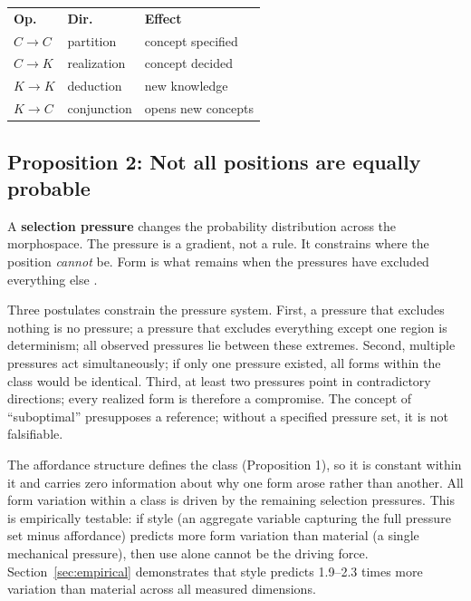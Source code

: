 \begin{center}\small
\begin{tabular}{@{}l@{\;\;}l@{\;\;}l@{}}
\textbf{Op.} & \textbf{Dir.} & \textbf{Effect} \\[2pt]
$C \!\to\! C$ & partition & concept specified \\
$C \!\to\! K$ & realization & concept decided \\
$K \!\to\! K$ & deduction & new knowledge \\
$K \!\to\! C$ & conjunction & opens new concepts \\
\end{tabular}
\end{center}

\subsection{Proposition 2: Not all positions are equally probable}
\label{sec:prop2}

A \textbf{selection pressure} changes the probability distribution across the morphospace. The pressure is a gradient, not a rule. It constrains where the position \textit{cannot} be. Form is what remains when the pressures have excluded everything else \parencite{Michl1995}.

Three postulates constrain the pressure system. First, a pressure that excludes nothing is no pressure; a pressure that excludes everything except one region is determinism; all observed pressures lie between these extremes. Second, multiple pressures act simultaneously; if only one pressure existed, all forms within the class would be identical. Third, at least two pressures point in contradictory directions; every realized form is therefore a compromise. The concept of ``suboptimal'' presupposes a reference; without a specified pressure set, it is not falsifiable.

The affordance structure defines the class (Proposition 1), so it is constant within it and carries zero information about why one form arose rather than another. All form variation within a class is driven by the remaining selection pressures. This is empirically testable: if style (an aggregate variable capturing the full pressure set minus affordance) predicts more form variation than material (a single mechanical pressure), then use alone cannot be the driving force. Section~\ref{sec:empirical} demonstrates that style predicts 1.9--2.3 times more variation than material across all measured dimensions.

